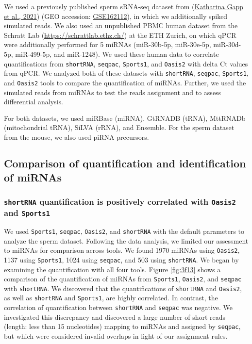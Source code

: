 \documentclass[12pt,twoside]{reedthesis}
\begin{document}
We used a previously published sperm sRNA-seq dataset from (\protect\hyperlink{ref-gapp2021}{Katharina Gapp et al., 2021})
(GEO accession:
\href{https://www.ncbi.nlm.nih.gov/geo/query/acc.cgi?acc=GSE162112}{GSE162112}),
in which we additionally spiked simulated reads. We also used an
unpublished PBMC human dataset from the Schratt Lab
(\url{https://schrattlab.ethz.ch/}) at the ETH Zurich, on which qPCR were
additionally performed for 5 miRNAs (miR-30b-5p, miR-30e-5p, miR-30d-5p,
miR-499-5p, and miR-1248). We used these human data to correlate
quantifications from \texttt{shortRNA}, \texttt{seqpac}, \texttt{Sports1}, and \texttt{Oasis2} with
delta Ct values from qPCR. We analyzed both of these datasets with
\texttt{shortRNA}, \texttt{seqpac}, \texttt{Sports1}, and \texttt{Oasis2} tools to compare the
quantification of miRNAs. Further, we used the simulated reads from
miRNAs to test the reads assignment and to assess differential analysis.

For both datasets, we used miRBase (miRNA), GtRNADB (tRNA), MttRNADb
(mitochondrial tRNA), SiLVA (rRNA), and Ensemble. For the sperm dataset
from the mouse, we also used piRNA precursors.

\hypertarget{comparison-of-quantification-and-identification-of-mirnas}{%
\subsection{Comparison of quantification and identification of miRNAs}\label{comparison-of-quantification-and-identification-of-mirnas}}

\hypertarget{shortrna-quantification-is-positively-correlated-with-oasis2-and-sports1}{%
\subsubsection{\texorpdfstring{\texttt{shortRNA} quantification is positively correlated with \texttt{Oasis2} and \texttt{Sports1}}{shortRNA quantification is positively correlated with Oasis2 and Sports1}}\label{shortrna-quantification-is-positively-correlated-with-oasis2-and-sports1}}

We used \texttt{Sports1}, \texttt{seqpac}, \texttt{Oasis2}, and \texttt{shortRNA} with the default
parameters to analyze the sperm dataset. Following the data analysis, we
limited our assessment to miRNAs for comparison across tools. We found
1970 miRNAs using \texttt{Oasis2}, 1137 using \texttt{Sports1}, 1024 using \texttt{seqpac},
and 503 using \texttt{shortRNA}. We began by examining the quantification with
all four tools. Figure \ref{fig:3f13} shows a comparison of the
quantification of miRNAs from \texttt{Sports1}, \texttt{Oasis2}, and \texttt{seqpac} with
\texttt{shortRNA}. We discovered that the quantifications of \texttt{shortRNA} and
\texttt{Oasis2}, as well as \texttt{shortRNA} and \texttt{Sports1}, are highly correlated. In
contrast, the correlation of quantification between \texttt{shortRNA} and
\texttt{seqpac} was negative. We investigated this discrepancy and discovered a
large number of short reads (length: less than 15 nucleotides) mapping
to miRNAs and assigned by \texttt{seqpac}, but which were considered invalid
overlaps in light of our assignment rules.
\end{document}
